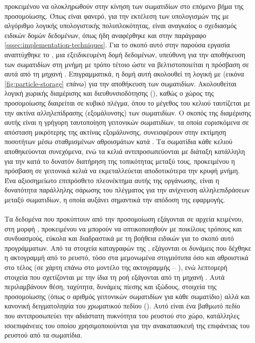  προκειμένου να ολοκληρωθούν στην κίνηση των σωματιδίων στο επόμενο βήμα της
προσομοίωσης. Όπως είναι φανερό, για την εκτέλεση των υπολογισμών της  με
αλγόριθμο λογικής υπολογιστικής πολυπλοκότητας, είναι αναγκαίος ο σχεδιασμός ειδικών δομών
δεδομένων, όπως ήδη αναφέρθηκε και στην παράγραφο
\ref{sssec:implementation-techniques}. Για το σκοπό αυτό στην παρούσα εργασία αναπτύχθηκε
το , μια εξειδικευμένη δομή δεδομένων, υπεύθυνη για την αποθήκευση των
σωματιδίων στη μνήμη με τρόπο τέτοιο ώστε να βελτιστοποιείται η πρόσβαση σε αυτά από τη
μηχανή . Επιγραμματικά, η δομή αυτή ακολουθεί τη λογική  με  (εικόνα \ref{fig:particle-storage} επάνω) για την αποθήκευση των
σωματιδίων. Ακολουθείται λογική χωρικής διαμέρισης και διευθυνσιοδότησης (), καθώς ο χώρος της προσομοίωσης διαιρείται σε κυβικό πλέγμα, όπου το μέγεθος
του κελιού ταυτίζεται με την ακτίνα αλληλεπίδρασης (εξομάλυνσης) των σωματιδίων. Ο σκοπός
της διαμέρισης αυτής είναι η γρήγορη ταυτοποίηση γειτονικών σωματιδίων, τα οποία
ευρισκόμενα σε απόσταση μικρότερης της ακτίνας εξομάλυνσης, συνεισφέρουν στην εκτίμηση
ποσοτήτων μέσω σταθμισμένων αθροισμάτων κατά . Τα σωματίδια κάθε κελιού
αποθηκεύονται συνεχόμενα, ενώ τα κελιά αντιπροσωπεύονται με διάταξη κατάλληλη για την κατά
το δυνατόν διατήρηση της τοπικότητας μεταξύ τους, προκειμένου η πρόσβαση σε γειτονικά
κελιά να εκμεταλλεύεται αποδοτικότερα την κρυφή μνήμη. Ένα αξιοσημείωτο επιπρόσθετο
πλεονέκτημα αυτής της οργάνωσης, είναι η δυνατότητα παράλληλης σάρωσης του πλέγματος για
την ανίχνευση αλληλεπιδράσεων μεταξύ σωματιδίων, η οποία αυξάνει σημαντικά την απόδοση της
εφαρμογής.

\paragraph{} Τα δεδομένα που προκύπτουν από την προσομοίωση εξάγονται σε αρχεία κειμένου,
στη μορφή , προκειμένου να μπορούν να οπτικοποιηθούν με ποικίλους τρόπους και
συνδυασμούς, εύκολα και διαδραστικά με τη βοήθεια ειδικών για το σκοπό αυτό
προγράμματων. Από τα στοιχεία καταγραφών της , εξάγονται οι δυνάμεις που
δέχθηκε η ακτογραμμή από το ρευστό, τόσο στα μεμονωμένα στιγμιότυπα όσο και αθροιστικά στο
τέλος (σε χάρτη επάνω στο μοντέλο της ακτογραμμής -- ), ενώ
λεπτομερή στοιχεία που σχετίζονται με την ίδια τη ροή εξάγονται από τη μηχανή
. Αυτά περιλαμβάνουν θέση, ταχύτητα, δυνάμεις πίεσης και ιξώδους, στοιχεία της
προσομοίωσης (όπως ο αριθμός γειτονικών σωματιδίων για κάθε σωματίδιο) αλλά και κανονική
δειγματοληψία του χρωματικού πεδίου (). Αυτό είναι ένα βαθμωτό πεδίο που
αντιπροσωπεύει την αδιάστατη πυκνότητα του ρευστού στο χώρο, κατάλληλες ισοεπιφάνειες του
οποίου χρησιμοποιούνται για την ανακατασκευή της επιφάνειας του ρευστού από τα σωματίδια.


